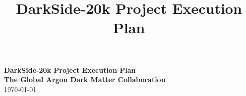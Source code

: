 \documentclass[aps,superscriptaddress,floatfix,nofootinbib,showpacs,amsmath,amssymb,altaffilletter,floatfix,11pt]{revtex4-1}
\begin{document}
\setlength{\parindent}{1em}
\setdefaultleftmargin{1em}{1em}{}{}{}{}
\setcounter{page}{0}\thispagestyle{empty}
\onecolumngrid
\begin{center}
{\bf \LARGE DarkSide-20k Project Execution Plan}\\
\vspace{.5in}
{\bf \Large The Global Argon Dark Matter Collaboration}\\
\vspace{.5in}
\today
\end{center}
\vspace{.2in}
%
\clearpage
\newpage
{}
\title{DarkSide-20k Project Execution Plan}

\maketitle
\clearpage
\onecolumngrid
\setcounter{tocdepth}{2}
\tableofcontents
\makeatletter
\let\toc@pre\relax
\let\toc@post\relax
\makeatother
\clearpage
\listoffigures
\clearpage
\listoftables
\clearpage
\newpage
{}
\clearpage
















\clearpage
\appendix



%



\end{document}
